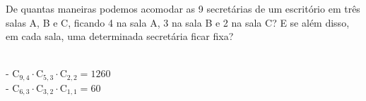 \begin{ex}
 De quantas maneiras podemos acomodar as 9 secretárias de um escritório em três salas A, B e C, ficando 4 na sala  A, 3 na sala B e 2 na sala C? E se além disso, em cada sala, uma determinada secretária ficar fixa?
   \begin{sol}
     \phantom{A} \\
     - $\mathrm{C}_{9,4}\cdot\mathrm{C}_{5,3}\cdot\mathrm{C}_{2,2} = 1260$ \\
     - $\mathrm{C}_{6,3}\cdot\mathrm{C}_{3,2}\cdot\mathrm{C}_{1,1}=60$
     
   \end{sol}
\end{ex}